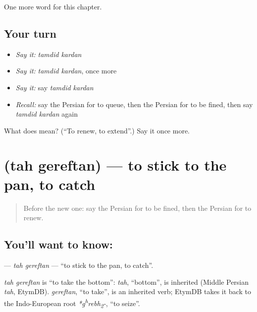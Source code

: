 \begin{grammarlens}[title={What you've built}]
One more word for this chapter.
\end{grammarlens}

\subsection*{Your turn}
\begin{itemize}
\raggedright
  \item \emph{Say it:} \emph{tamdid kardan}
  \item \emph{Say it:} \emph{tamdid kardan}, once more
  \item \emph{Say it:} say \emph{tamdid kardan}
  \item \emph{Recall:} say the Persian for to queue, then the Persian for to be fined, then say \emph{tamdid kardan} again
\end{itemize}

\begin{tcolorbox}[breakable,colback=teal!4,colframe=teal!35!black,title={Before you move on}]
What does   mean? (\textquotedblleft{}To renew, to extend\textquotedblright{}.) Say it once more.
\end{tcolorbox}
\section[\texorpdfstring{\fa{ته} \fa{گرفتن} (tah gereftan)}{ته گرفتن (tah gereftan)}]{  (tah gereftan) — to stick to the pan, to catch}

\label{lesson:FA-C262-tah-gereftan}



\begin{quote}
Before the new one: say the Persian for to be fined, then the Persian for to renew.
\end{quote}

\subsection*{You'll want to know:  }
\textbf{ } — \emph{tah gereftan} — \textquotedblleft{}to stick to the pan, to catch\textquotedblright{}.

\begin{cousinweb}
\emph{tah gereftan} is \textquotedblleft{}to take the bottom\textquotedblright{}: \emph{tah}, \textquotedblleft{}bottom\textquotedblright{}, is inherited (Middle Persian \emph{tah}, EtymDB). \emph{gereftan}, \textquotedblleft{}to take\textquotedblright{}, is an inherited verb; EtymDB takes it back to the Indo-European root \emph{*g\textsuperscript{h}rebh\textsubscript{2}-}, \textquotedblleft{}to seize\textquotedblright{}.
\end{cousinweb}

